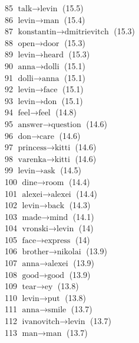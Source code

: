 \begin{appendices}
    85  $ \text{talk} \to \text{levin} $ (15.5) \\
    86  $ \text{levin} \to \text{man} $ (15.4) \\
    87  $ \text{konstantin} \to \text{dmitrievitch} $ (15.3) \\
    88  $ \text{open} \to \text{door} $ (15.3) \\
    89  $ \text{levin} \to \text{heard} $ (15.3) \\
    90  $ \text{anna} \to \text{dolli} $ (15.1) \\
    91  $ \text{dolli} \to \text{anna} $ (15.1) \\
    92  $ \text{levin} \to \text{face} $ (15.1) \\
    93  $ \text{levin} \to \text{don} $ (15.1) \\
    94  $ \text{feel} \to \text{feel} $ (14.8) \\
    95  $ \text{answer} \to \text{question} $ (14.6) \\
    96  $ \text{don} \to \text{care} $ (14.6) \\
    97  $ \text{princess} \to \text{kitti} $ (14.6) \\
    98  $ \text{varenka} \to \text{kitti} $ (14.6) \\
    99  $ \text{levin} \to \text{ask} $ (14.5) \\
   100  $ \text{dine} \to \text{room} $ (14.4) \\
   101  $ \text{alexei} \to \text{alexei} $ (14.4) \\
   102  $ \text{levin} \to \text{back} $ (14.3) \\
   103  $ \text{made} \to \text{mind} $ (14.1) \\
   104  $ \text{vronski} \to \text{levin} $ (14) \\
   105  $ \text{face} \to \text{express} $ (14) \\
   106  $ \text{brother} \to \text{nikolai} $ (13.9) \\
   107  $ \text{anna} \to \text{alexei} $ (13.9) \\
   108  $ \text{good} \to \text{good} $ (13.9) \\
   109  $ \text{tear} \to \text{ey} $ (13.8) \\
   110  $ \text{levin} \to \text{put} $ (13.8) \\
   111  $ \text{anna} \to \text{smile} $ (13.7) \\
   112  $ \text{ivanovitch} \to \text{levin} $ (13.7) \\
   113  $ \text{man} \to \text{man} $ (13.7) \\

\end{appendices}
